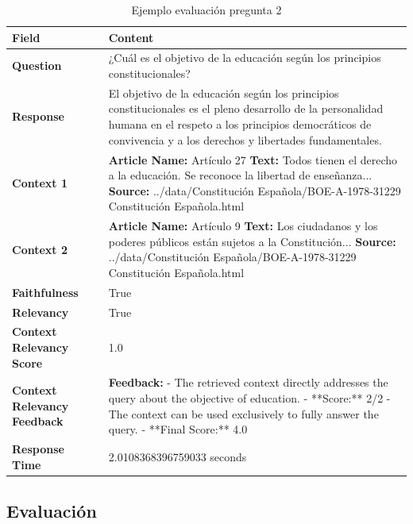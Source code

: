 \begin{table}[h]
\centering
\begin{tabular}{|p{4cm}|p{11cm}|}
\hline
\textbf{Field} & \textbf{Content} \\ \hline
\textbf{Question} & ¿Cuál es el objetivo de la educación según los principios constitucionales? \\ \hline
\textbf{Response} & El objetivo de la educación según los principios constitucionales es el pleno desarrollo de la personalidad humana en el respeto a los principios democráticos de convivencia y a los derechos y libertades fundamentales. \\ \hline
\textbf{Context 1} & 
\textbf{Article Name:} Artículo 27 \newline 
\textbf{Text:} Todos tienen el derecho a la educación. Se reconoce la libertad de enseñanza... \newline
\textbf{Source:} ../data/Constitución Española/BOE-A-1978-31229 Constitución Española.html
\\ \hline
\textbf{Context 2} & 
\textbf{Article Name:} Artículo 9 \newline
\textbf{Text:} Los ciudadanos y los poderes públicos están sujetos a la Constitución... \newline
\textbf{Source:} ../data/Constitución Española/BOE-A-1978-31229 Constitución Española.html
\\ \hline
\textbf{Faithfulness} & True \\ \hline
\textbf{Relevancy} & True \\ \hline
\textbf{Context Relevancy Score} & 1.0 \\ \hline
\textbf{Context Relevancy Feedback} & 
\textbf{Feedback:} \newline
- The retrieved context directly addresses the query about the objective of education. \newline
- **Score:** 2/2 \newline
- The context can be used exclusively to fully answer the query. \newline
- **Final Score:** 4.0
\\ \hline
\textbf{Response Time} & 2.0108368396759033 seconds \\ \hline
\end{tabular}
\caption{Ejemplo evaluación pregunta 2}
\label{tab:evaluation12}
\end{table}

\subsection{Evaluación}

